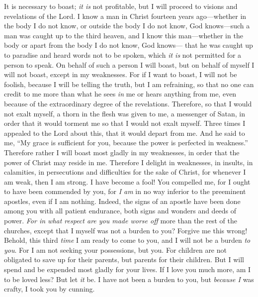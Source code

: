 \begin{biblechapter} %
 It is necessary to boast; \textit{it is} not profitable, but I will proceed to visions and revelations of the Lord.
\verse I know a man in Christ fourteen years ago—whether in the body I do not know, or outside the body I do not know, God knows—such a man was caught up to the third heaven,
\verse and I know this man—whether in the body or apart from the body I do not know, God knows—
\verse that he was caught up to paradise and heard words not to be spoken, which \textit{it is} not permitted for a person to speak.
\verse On behalf of such a person I will boast, but on behalf of myself I will not boast, except in my weaknesses.
\verse For if I want to boast, I will not be foolish, because I will be telling the truth, but I am refraining, so that no one can credit to me more than what he sees \textit{in} me or hears anything from me,
\verse even because of the extraordinary degree of the revelations. Therefore, so that I would not exalt myself, a thorn in the flesh was given to me, a messenger of Satan, in order that it would torment me so that I would not exalt myself.
\verse Three times I appealed to the Lord about this, that it would depart from me.
\verse And he said to me, “My grace is sufficient for you, because the power is perfected in weakness.” Therefore rather I will boast most gladly in my weaknesses, in order that the power of Christ may reside in me.
\verse Therefore I delight in weaknesses, in insults, in calamities, in persecutions and difficulties for the sake of Christ, for whenever I am weak, then I am strong.
 I have become a fool! You compelled me, for I ought to have been commended by you, for \textit{I am} in no way inferior to the preeminent apostles, even if I am nothing.
\verse Indeed, the signs of an apostle have been done among you with all patient endurance, both signs and wonders and deeds of power.
\verse \textit{For in what respect are you made worse off} more than the rest of the churches, except that I myself was not a burden to you? Forgive me this wrong!
\verse Behold, this third \textit{time} I am ready to come to you, and I will not be a burden \textit{to you}. For I am not seeking your possessions, but you. For children are not obligated to save up for their parents, but parents for their children.
\verse But I will spend and be expended most gladly for your lives. If I love you much more, am I to be loved less?
\verse But let \textit{it} be. I have not been a burden to you, but \textit{because I} was crafty, I took you by cunning.

\end{biblechapter}
